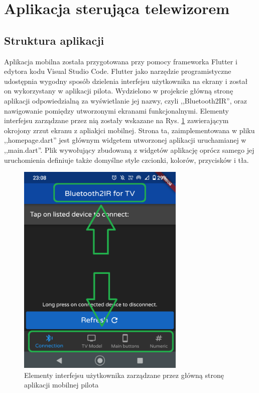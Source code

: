 \documentclass[12pt,twoside,draft]{article}
\begin{document}
\clearpage

\section{Aplikacja sterująca telewizorem}
\subsection{Struktura aplikacji}
Aplikacja mobilna została przygotowana przy pomocy frameworka Flutter i edytora kodu Visual Studio Code. Flutter jako narzędzie programistyczne udostępnia wygodny sposób dzielenia interfejsu użytkownika na ekrany i został on wykorzystany w aplikacji pilota. Wydzielono w projekcie główną stronę aplikacji odpowiedzialną za wyświetlanie jej nazwy, czyli ,,Bluetooth2IR'', oraz nawigowanie pomiędzy utworzonymi ekranami funkcjonalnymi. Elementy interfejsu zarządzane przez nią zostały wskazane na Rys. \ref*{Fig:mainPageElements} zawierającym okrojony zrzut ekranu z apliakjci mobilnej. Strona ta, zaimplementowana w pliku ,,homepage.dart'' jest głównym widgetem utworzonej aplikacji uruchamianej w ,,main.dart''. Plik wywołujący zbudowaną z widgetów aplikację oprócz samego jej uruchomienia definiuje także domyślne style czcionki, kolorów, przycisków i tła.
\begin{figure}[ht]
   \centering
   \includegraphics[width=8cm]{images/mainPageElements.png}
   \caption{Elementy interfejsu użytkownika zarządzane przez główną stronę aplikacji mobilnej pilota}
   \label{Fig:mainPageElements}
\end{figure}
\end{document}

